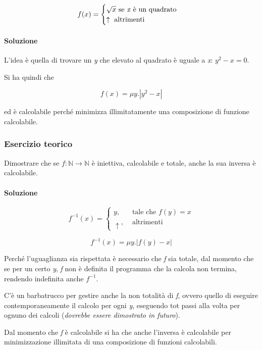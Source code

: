 $$
f(x) = \begin{cases}
\sqrt{x} \text{ se \textit{x} è un quadrato} \\
\uparrow \text{ altrimenti}
\end{cases}
$$

\paragraph{Soluzione}

L'idea è quella di trovare un \textit{y} che elevato al quadrato è uguale a \textit{x}: $ y^2 - x = 0 $.

Si ha quindi che

$$ 
f(x) = \mu y.|y^2-x|
$$

ed è calcolabile perché minimizza illimitatamente una composizione di funzione calcolabile.

\subsubsection{Esercizio teorico}

Dimostrare che se $ f : \mathbb{N} \rightarrow \mathbb{N} $ è iniettiva, calcolabile e totale, anche la sua inversa è calcolabile.

\paragraph{Soluzione}

$$
f^{-1}(x) = \begin{cases}
y, &\text{ tale che } f(y) = x \\
\uparrow, &\text{ altrimenti}  
\end{cases}
$$

$$ 
f^{-1}(x) = \mu y.|f(y)-x|
$$

Perché l'uguaglianza sia rispettata è necessario che \textit{f} sia totale, dal momento che se per un certo \textit{y}, \textit{f} non è definita il programma che la calcola non termina, rendendo indefinita anche $ f^{-1} $.

C'è un barbatrucco per gestire anche la non totalità di \textit{f}, ovvero quello di eseguire contemporaneamente il calcolo per ogni \textit{y}, eseguendo tot passi alla volta per ognuno dei calcoli (\textit{dovrebbe essere dimostrato in futuro}).

Dal momento che \textit{f} è calcolabile si ha che anche l'inversa è calcolabile per minimizzazione illimitata di una composizione di funzioni calcolabili.

